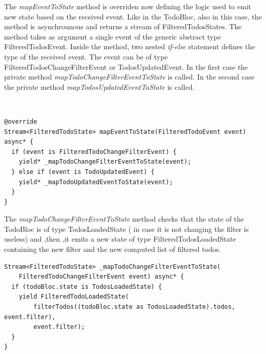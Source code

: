 The \textit{mapEventToState }method is overriden now defining the logic used to emit new state based on the received event. Like in the TodoBloc, also in this case, the method is asynchrounous and returns a stream of FilteredTodosStates. The method takes as argument a single event of the generic abstract type FilteredTodosEvent. Inside the method, two nested \textit{if-else} statement defines the type of the received event. The event can be of type FilteredTodosChangeFilterEvent or TodosUpdatedEvent. In the first case the private method \textit{mapTodoChangeFilterEventToState} is called. In the second case the private method \textit{mapTodosUpdatedEventToState} is called. 
\begin{code}
\mbox{}\\
 \mbox{}
\label{code:2.14}
\begin{verbatim}
@override
Stream<FilteredTodoState> mapEventToState(FilteredTodoEvent event) async* {
  if (event is FilteredTodoChangeFilterEvent) {
    yield* _mapTodoChangeFilterEventToState(event);
  } else if (event is TodoUpdatedEvent) {
    yield* _mapTodoUpdatedEventToState(event);
  }
}
\end{verbatim}
\mbox{}
\end{code}

The \textit{mapTodoChangeFilterEventToState} method  checks that the state of the TodoBloc is of type TodosLoadedState ( in case it is not changing the filter is useless) and ,then ,it emits a new state of type FilteredTodosLoadedState containing the new filter and the new computed list of filtered todos.

\begin{code}
\mbox{}
 \mbox{}
\label{code:2.14}
\begin{verbatim}
Stream<FilteredTodoState> _mapTodoChangeFilterEventToState(
    FilteredTodoChangeFilterEvent event) async* {
  if (todoBloc.state is TodosLoadedState) {
    yield FilteredTodoLoadedState(
        filterTodos((todoBloc.state as TodosLoadedState).todos, event.filter),
        event.filter);
  }
}
\end{verbatim}
\mbox{}
\end{code}

